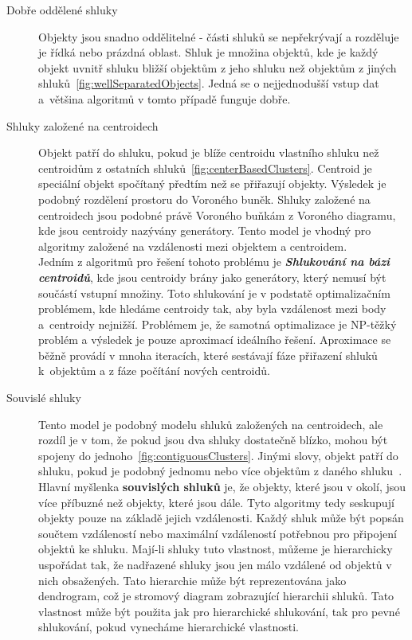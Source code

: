 \begin{description}
\item[Dobře oddělené shluky] Objekty jsou snadno oddělitelné - části shluků se ne\-pře\-krý\-va\-jí a rozděluje je řídká nebo prázdná oblast. Shluk je množina objektů, kde je každý objekt uvnitř shluku bližší objektům z jeho shluku než objektům z jiných shluků~\autoref{fig:wellSeparatedObjects}. Jedná se o nejjednodušší vstup dat a~většina algoritmů v tomto případě funguje dobře.

\item[Shluky založené na centroidech] Objekt patří do shluku, pokud je blíže centroidu vlastního shluku než centroidům z ostatních shluků~\autoref{fig:centerBasedClusters}. Centroid je speciální objekt spočítaný předtím než se přiřazují objekty. Výsledek je podobný rozdělení prostoru do Voroného buněk. Shluky založené na centroidech jsou podobné právě Voroného buňkám z Voroného diagramu, kde jsou centroidy nazývány generátory. Tento model je vhodný pro algoritmy založené na vzdálenosti mezi objektem a centroidem.\\
Jedním z algoritmů pro řešení tohoto problému je \textit{\textbf {Shlukování na bázi centroidů}}, kde jsou centroidy brány jako generátory, který nemusí být součástí vstupní množiny. Toto shlukování je v podstatě optimalizačním problémem, kde hledáme centroidy tak, aby byla vzdálenost mezi body a~centroidy nejnižší. Problémem je, že samotná optimalizace je NP-těžký problém a výsledek je pouze aproximací ideálního řešení. Aproximace se běžně provádí v mnoha iteracích, které sestávají fáze přiřazení shluků k~objektům a z fáze počítání nových centroidů.

\item[Souvislé shluky] Tento model je podobný modelu shluků založených na centroidech, ale rozdíl je v tom, že pokud jsou dva shluky dostatečně blízko, mohou být spojeny do jednoho~\autoref{fig:contiguousClusters}. Jinými slovy, objekt patří do shluku, pokud je podobný jednomu nebo více objektům z daného shluku~\cite{Tan05}. \\
Hlavní myšlenka \textbf {souvislých shluků} je, že objekty, které jsou v okolí, jsou více příbuzné než objekty, které jsou dále. Tyto algoritmy tedy seskupují objekty pouze na základě jejich vzdálenosti. Každý shluk může být popsán součtem vzdáleností nebo maximální vzdáleností potřebnou pro připojení objektů ke shluku. Mají-li shluky tuto vlastnost, můžeme je hierarchicky uspořádat tak, že nadřazené shluky jsou jen málo vzdálené od objektů v nich obsažených. Tato hierarchie může být reprezentována jako dendrogram, což je stromový diagram zobrazující hierarchii shluků. Tato vlastnost může být použita jak pro hierarchické shlukování, tak pro pevné shlukování, pokud vynecháme hierarchické vlastnosti. \\


\end{description}
